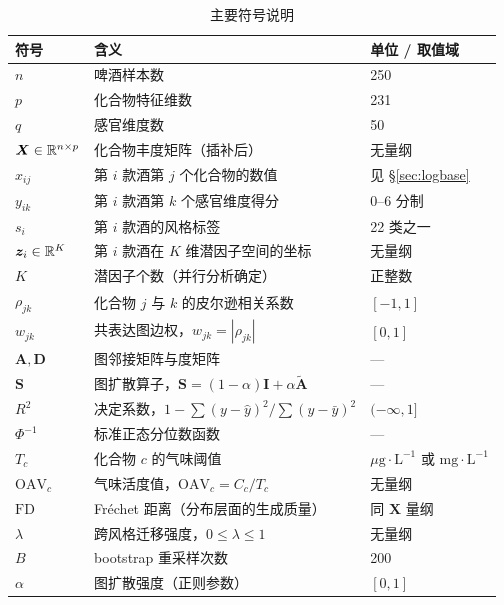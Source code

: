 \begin{table}[H]
\centering
\caption{主要符号说明}
\label{tab:symbols}
\small
\begin{fittable}
\begin{tabular}{@{}lll@{}}
\toprule
符号 & 含义 & 单位 / 取值域 \\
\midrule
$n$ & 啤酒样本数 & 250 \\
$p$ & 化合物特征维数 & 231 \\
$q$ & 感官维度数 & 50 \\
$\bm{X}\in\mathbb{R}^{n\times p}$ & 化合物丰度矩阵（插补后） & 无量纲 \\
$x_{ij}$ & 第 $i$ 款酒第 $j$ 个化合物的数值 & 见 \S\ref{sec:logbase} \\
$y_{ik}$ & 第 $i$ 款酒第 $k$ 个感官维度得分 & 0--6 分制 \\
$s_i$ & 第 $i$ 款酒的风格标签 & 22 类之一 \\
$\bm{z}_i\in\mathbb{R}^{K}$ & 第 $i$ 款酒在 $K$ 维潜因子空间的坐标 & 无量纲 \\
$K$ & 潜因子个数（并行分析确定） & 正整数 \\
$\rho_{jk}$ & 化合物 $j$ 与 $k$ 的皮尔逊相关系数 & $[-1,1]$ \\
$w_{jk}$ & 共表达图边权，$w_{jk}=|\rho_{jk}|$ & $[0,1]$ \\
$\bm{A},\bm{D}$ & 图邻接矩阵与度矩阵 & --- \\
$\bm{S}$ & 图扩散算子，$\bm{S}=(1-\alpha)\bm{I}+\alpha\tilde{\bm{A}}$ & --- \\
$R^2$ & 决定系数，$1-\sum(y-\hat y)^2/\sum(y-\bar y)^2$ & $(-\infty,1]$ \\
$\Phi^{-1}$ & 标准正态分位数函数 & --- \\
$T_c$ & 化合物 $c$ 的气味阈值 & $\mu\mathrm{g\cdot L^{-1}}$ 或 $\mathrm{mg\cdot L^{-1}}$ \\
$\mathrm{OAV}_c$ & 气味活度值，$\mathrm{OAV}_c=C_c/T_c$ & 无量纲 \\
$\mathrm{FD}$ & Fréchet 距离（分布层面的生成质量） & 同 $\bm{X}$ 量纲 \\
$\lambda$ & 跨风格迁移强度，$0\le\lambda\le1$ & 无量纲 \\
$B$ & bootstrap 重采样次数 & 200 \\
$\alpha$ & 图扩散强度（正则参数） & $[0,1]$ \\
\bottomrule
\end{tabular}
\end{fittable}
\end{table}
